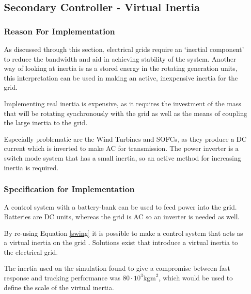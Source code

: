 \subsection{Secondary Controller - Virtual Inertia}
\label{sec:vi}

\subsubsection{Reason For Implementation}

As discussed through this section, electrical grids require an `inertial component' to reduce the bandwidth and aid in achieving stability of the system.
Another way of looking at inertia is as a stored energy in the rotating generation units, this interpretation can be used in making an active, inexpensive inertia for the grid.

Implementing real inertia is expensive, as it requires the investment of the mass that will be rotating synchronously with the grid as well as the means of coupling the large inertia to the grid.

Especially problematic are the Wind Turbines and SOFCs, as they produce a DC current which is inverted to make AC for transmission.
The power inverter is a switch mode system that has a small inertia, so an active method for increasing inertia is required.

\subsubsection{Specification for Implementation}

A control system with a battery-bank can be used to feed power into the grid.
Batteries are DC units, whereas the grid is AC so an inverter is needed as well.

By re-using Equation \ref{swing} it is possible to make a control system that acts as a virtual inertia on the grid \cite{power:inertia}.
Solutions exist \cite{power:inertia} that introduce a virtual inertia to the electrical grid. 

The inertia used on the simulation found to give a compromise between fast response and tracking performance was $80 \cdot 10^3\text{kgm}^2$, which would be used to define the scale of the virtual inertia.

